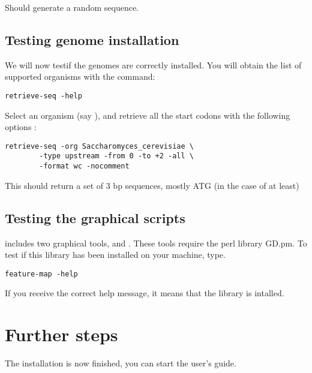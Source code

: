 \documentclass{article}
\begin{document}
Should generate a random sequence.

\subsection{Testing genome installation}

We will now testif the genomes are correctly installed. You will
obtain the list of supported organisms with the command:

\begin{verbatim}
retrieve-seq -help
\end{verbatim}

Select an organism (say ), and
retrieve all the start codons with the following options :

\begin{verbatim}
retrieve-seq -org Saccharomyces_cerevisiae \
        -type upstream -from 0 -to +2 -all \
        -format wc -nocomment 
\end{verbatim}

This should return a set of 3 bp sequences, mostly ATG (in the case of
 at least)

\subsection{Testing the graphical scripts}

\RSAT includes two graphical tools,  and
. These tools require the perl library GD.pm. To test
if this library has been installed on your machine, type.

\begin{verbatim}
feature-map -help
\end{verbatim}

If you receive the correct help message, it means that the library is
intalled.


\section{Further steps}

The installation is now finished, you can start the user's guide. 
\end{document}
